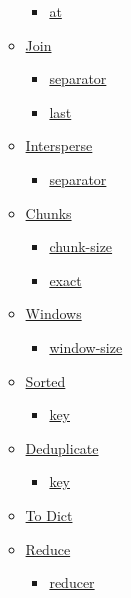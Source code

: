 \begin{itemize}
\begin{itemize}
    \begin{itemize}
    \tightlist
    \item
      \hyperref[definitions-split-at]{at}
    \end{itemize}
  \item
    \hyperref[definitions-join]{Join}

    \begin{itemize}
    \tightlist
    \item
      \hyperref[definitions-join-separator]{separator}
    \item
      \hyperref[definitions-join-last]{last}
    \end{itemize}
  \item
    \hyperref[definitions-intersperse]{Intersperse}

    \begin{itemize}
    \tightlist
    \item
      \hyperref[definitions-intersperse-separator]{separator}
    \end{itemize}
  \item
    \hyperref[definitions-chunks]{Chunks}

    \begin{itemize}
    \tightlist
    \item
      \hyperref[definitions-chunks-chunk-size]{chunk-size}
    \item
      \hyperref[definitions-chunks-exact]{exact}
    \end{itemize}
  \item
    \hyperref[definitions-windows]{Windows}

    \begin{itemize}
    \tightlist
    \item
      \hyperref[definitions-windows-window-size]{window-size}
    \end{itemize}
  \item
    \hyperref[definitions-sorted]{Sorted}

    \begin{itemize}
    \tightlist
    \item
      \hyperref[definitions-sorted-key]{key}
    \end{itemize}
  \item
    \hyperref[definitions-dedup]{Deduplicate}

    \begin{itemize}
    \tightlist
    \item
      \hyperref[definitions-dedup-key]{key}
    \end{itemize}
  \item
    \hyperref[definitions-to-dict]{To Dict}
  \item
    \hyperref[definitions-reduce]{Reduce}

    \begin{itemize}
    \tightlist
    \item
      \hyperref[definitions-reduce-reducer]{reducer}
    \end{itemize}
  \end{itemize}
\end{itemize}

